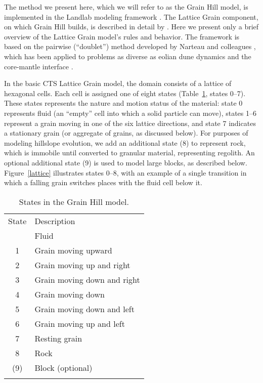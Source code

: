 \documentclass[esurf, manuscript]{copernicus}
\begin{document}
The method we present here, which we will refer to as the Grain Hill model, is implemented in the Landlab modeling framework \citep{hobley2017creative}. The Lattice Grain component, on which Grain Hill builds, is described in detail by \citet{tucker2016celllab}. Here we present only a brief overview of the Lattice Grain model's rules and behavior. The framework is based on the pairwise (``doublet'') method developed by Narteau and colleagues \citep{rozier2014real}, which has been applied to problems as diverse as eolian dune dynamics \citep{narteau2009setting,zhang2010morphodynamics,zhang2012morphology} and the core-mantle interface \citep{narteau2001small}.

In the basic CTS Lattice Grain model, the domain consists of a lattice of hexagonal cells. Each cell is assigned one of eight states (Table~\ref{statetable}, states 0--7). These states represents the nature and motion status of the material: state 0 represents fluid  (an ``empty'' cell into which a solid particle can move), states 1--6 represent a grain moving in one of the six lattice directions, and state 7 indicates a stationary grain (or aggregate of grains, as discussed below). For purposes of modeling hillslope evolution, we add an additional state (8) to represent rock, which is immobile until converted to granular material, representing regolith. An optional additional state (9) is used to model large blocks, as described below. Figure~\ref{lattice} illustrates states 0--8, with an example of a single transition in which a falling grain switches places with the fluid cell below it. 


\begin{table}[t]
\caption{States in the Grain Hill model.}
\begin{tabular}{cl}
\tophline
State & Description \\
\middlehline
0 & Fluid \\
1 & Grain moving upward \\
2 & Grain moving up and right \\
3 & Grain moving down and right \\
4 & Grain moving down \\
5 & Grain moving down and left \\
6 & Grain moving up and left \\
7 & Resting grain \\
8 & Rock \\
(9) & Block (optional) \\
\bottomhline
\label{statetable}
\end{tabular}
\end{table}
\end{document}
